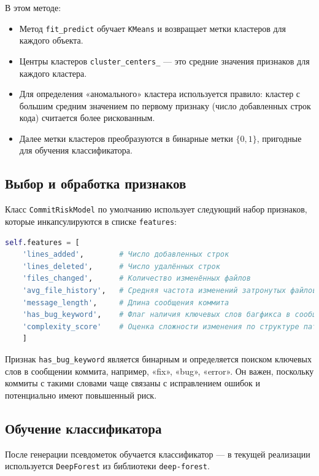 В этом методе:

\begin{itemize}
	\item Метод \texttt{fit\_predict} обучает \texttt{KMeans} и возвращает метки кластеров для каждого объекта.
	\item Центры кластеров \texttt{cluster\_centers\_} — это средние значения признаков для каждого кластера.
	\item Для определения «аномального» кластера используется правило: кластер с большим средним значением по первому признаку (число добавленных строк кода) считается более рискованным.
	\item Далее метки кластеров преобразуются в бинарные метки \(\{0,1\}\), пригодные для обучения классификатора.
\end{itemize}

\subsection{Выбор и обработка признаков}

Класс \texttt{CommitRiskModel} по умолчанию использует следующий набор признаков, которые инкапсулируются в списке \texttt{features}:

\begin{lstlisting}[language=Python, caption={Список признаков модели}]
	self.features = [
	'lines_added',        # Число добавленных строк
	'lines_deleted',      # Число удалённых строк
	'files_changed',      # Количество изменённых файлов
	'avg_file_history',   # Средняя частота изменений затронутых файлов
	'message_length',     # Длина сообщения коммита
	'has_bug_keyword',    # Флаг наличия ключевых слов багфикса в сообщении
	'complexity_score'    # Оценка сложности изменения по структуре патча
	]
\end{lstlisting}

Признак \texttt{has\_bug\_keyword} является бинарным и определяется поиском ключевых слов в сообщении коммита, например, «fix», «bug», «error». Он важен, поскольку коммиты с такими словами чаще связаны с исправлением ошибок и потенциально имеют повышенный риск.

\subsection{Обучение классификатора}

После генерации псевдометок обучается классификатор — в текущей реализации используется \texttt{DeepForest} из библиотеки \texttt{deep-forest}.

